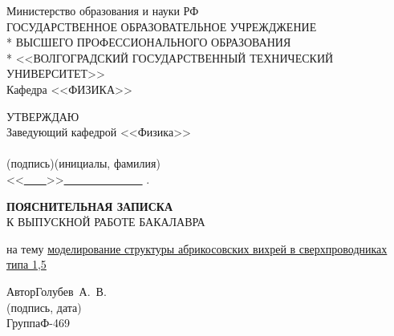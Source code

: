 \begin{titlepage}
	\begin{center}
		Министерство образования и науки РФ \\
		\vspace{.5cm}
		ГОСУДАРСТВЕННОЕ ОБРАЗОВАТЕЛЬНОЕ УЧРЕЖДЖЕНИЕ\\*
		ВЫСШЕГО ПРОФЕССИОНАЛЬНОГО ОБРАЗОВАНИЯ\\*
		<<ВОЛГОГРАДСКИЙ ГОСУДАРСТВЕННЫЙ ТЕХНИЧЕСКИЙ УНИВЕРСИТЕТ>>\\
		\vspace{.5cm}
		Кафедра <<ФИЗИКА>>
		\vspace{.5cm}
	\end{center}
	\begin{flushright}
		УТВЕРЖДАЮ\\
		Заведующий кафедрой <<Физика>>\\
		\vspace{.3cm}
		\underline{\hspace{2cm}}\hspace{1cm}\underline{\hspace{4cm}}\\
		\vspace{-.2cm}\footnotesize(подпись)\hspace{1.8cm}(инициалы, фамилия)
			\hspace*{.2cm}\ \normalsize\\
		\vspace{.3cm}
		<<\underline{\ \ \ \ }>>\underline{\ \ \ \ \ \ \ \ \ \ \ \ \ \ } 
			\the{}.
	\end{flushright}
	\begin{center}
		\LARGE \textbf{ПОЯСНИТЕЛЬНАЯ ЗАПИСКА} \\
		\large К ВЫПУСКНОЙ РАБОТЕ БАКАЛАВРА
	\end{center}
	\begin{center}
		на тему \underline{моделирование структуры абрикосовских вихрей в 
        	сверхпроводниках типа 1,5}
	\end{center}
	\begin{flushleft}
		Автор\hspace{2.5cm}Голубев~А.~В.\hfill\underline{\hspace{5cm}}\\
		\vspace{-.2cm}\hspace{14cm}\footnotesize(подпись, дата)\normalsize\\
		\vspace{-.5cm}
		Группа\hspace{2.2cm}Ф-469\\

\end{flushleft}
\end{titlepage}
